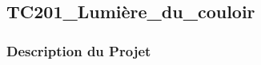 \documentclass[a4paper,12pt]{report}
\begin{document}
\newpage
\subsection{TC201\_Lumière\_du\_couloir}
\begin{center}
\label{}
\end{center}
\subsubsection{Description du Projet}
\end{document}
